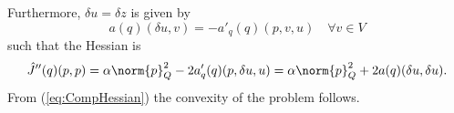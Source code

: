 Furthermore, $\delta u=\delta z$ is given by
%
\begin{equation}\label{eq:CompSecondStateCostate}
a(q)(\delta u, v)= -a'_q(q)(p,v,u)\quad\forall v\in V
\end{equation}
%
such that the Hessian is
%
\begin{equation}\label{eq:CompHessian}
\hat J''(q)(p,p) = \alpha\norm{p}^2_Q -2a'_q(q)(p,\delta u,u) = \alpha\norm{p}^2_Q +2a(q)(\delta u,\delta u).
\end{equation}
%
From (\ref{eq:CompHessian}) the convexity of the problem follows.


\printbibliography[title=References Section~\thesection]

